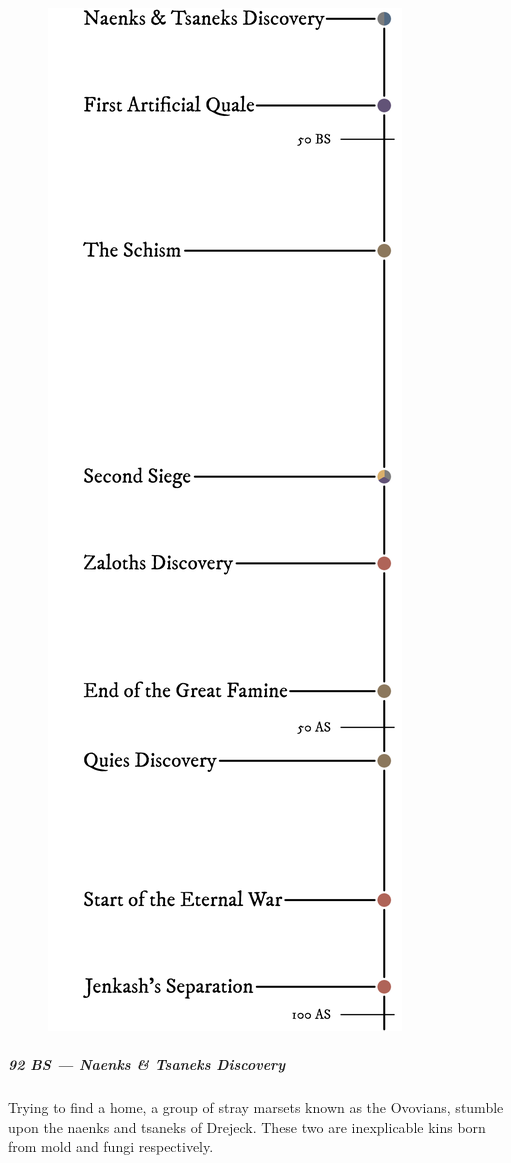 \begin{linenumbers}
\begin{figure}[H]
    \centering \includegraphics{01intro/img/30history_ii.png}
\end{figure}

\subparagraph{92 BS --- Naenks \& Tsaneks Discovery} Trying to find a home, a group of stray marsets known as the Ovovians, stumble upon the naenks and tsaneks of Drejeck.
These two are inexplicable kins born from mold and fungi respectively.


\end{linenumbers}
